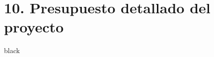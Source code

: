 \documentclass[11pt]{charter}
\begin{document}
\section{10. Presupuesto detallado del proyecto}
\label{sec:presupuesto}

\begin{consigna}{black}


\end{consigna}
\end{document}
